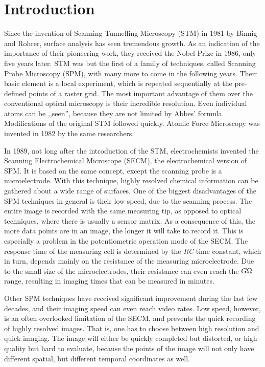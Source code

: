 \chapter{Introduction}
\pagestyle{headings}
Since the invention of Scanning Tunnelling Microscopy (STM) in 1981 by Binnig and Rohrer, surface analysis has seen tremendous growth.
As an indication of the importance of their pioneering work, they received the Nobel Prize in 1986, only five years later.
STM was but the first of a family of techniques, called Scanning Probe Microscopy (SPM), with many more to come in the following years.
Their basic element is a local experiment, which is repeated sequentially at the pre-defined points of a raster grid.
The most important advantage of them over the conventional optical microscopy is their incredible resolution.
Even individual atoms can be ,,seen'', because they are not limited by Abbes' formula.
Modifications of the original STM followed quickly.
Atomic Force Microscopy was invented in 1982 by the same researchers.

In 1989, not long after the introduction of the STM, electrochemists invented the Scanning Electrochemical Microscope (SECM), the electrochemical version of SPM.
It is based on the same concept, except the scanning probe is a microelectrode.
With this technique, highly resolved chemical information can be gathered about a wide range of surfaces.
One of the biggest disadvantages of the SPM techniques in general is their low speed, due to the scanning process.
The entire image is recorded with the same measuring tip, as opposed to optical techniques, where there is usually a sensor matrix.
As a consequence of this, the more data points are in an image, the longer it will take to record it.
This is especially a problem in the potentiometric operation mode of the SECM.
The response time of the measuring cell is determined by the \emph{RC} time constant, which in turn, depends mainly on the resistance of the measuring microelectrode.
Due to the small size of the microelectrodes, their resistance can even reach the $G\ohm$ range, resulting in imaging times that can be measured in minutes.

Other SPM techniques have received significant improvement during the last few decades, and their imaging speed can even reach video rates.
Low speed, however, is an often overlooked limitation of the SECM, and prevents the quick recording of highly resolved images.
That is, one has to choose between high resolution and quick imaging.
The image will either be quickly completed but distorted, or high quality but hard to evaluate, because the points of the image will not only have different spatial, but different temporal coordinates as well.

